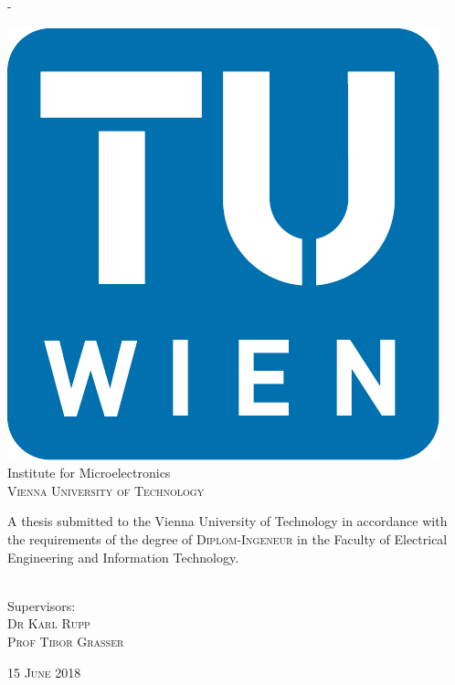 \begin{titlingpage}
\begin{SingleSpace}
\begin{adjustwidth*}{\unitlength}{-\unitlength}
\begin{center}
\includegraphics[scale=0.5]{logos/TU_Signet}\\
\vspace{6mm}
{\large Institute for Microelectronics\\
\textsc{Vienna University of Technology}}\\
\vspace{11mm}
\begin{minipage}{12cm}
A thesis submitted to the Vienna University of Technology in accordance with the requirements of the degree of \textsc{Diplom-Ingeneur} in the Faculty of Electrical Engineering and Information Technology.
\end{minipage}\\
\vspace*{7mm}
{Supervisors:\\ \textsc{Dr Karl Rupp}\\
\textsc{Prof Tibor Grasser}}

\vspace{5mm}
{\large\textsc{15 June 2018}}
\vspace{12mm}
\end{center}
\begin{flushright}
\end{flushright}
\end{adjustwidth*}
\end{SingleSpace}
\end{titlingpage}